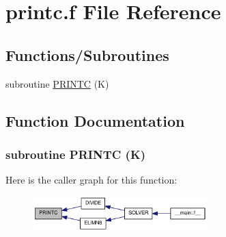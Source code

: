 \hypertarget{printc_8f}{
\section{printc.f File Reference}
\label{printc_8f}
}
\subsection*{Functions/Subroutines}
\begin{DoxyCompactItemize}
\item 
subroutine \hyperlink{printc_8f_a9cd500386a189740cbb92d34ebd2624d}{PRINTC} (K)
\end{DoxyCompactItemize}


\subsection{Function Documentation}
\hypertarget{printc_8f_a9cd500386a189740cbb92d34ebd2624d}{
\subsubsection[{PRINTC}]{\setlength{\rightskip}{0pt plus 5cm}subroutine PRINTC (K)}}
\label{printc_8f_a9cd500386a189740cbb92d34ebd2624d}


Here is the caller graph for this function:\nopagebreak
\begin{figure}[H]
\begin{center}
\leavevmode
\includegraphics[width=191pt]{printc_8f_a9cd500386a189740cbb92d34ebd2624d_icgraph}
\end{center}
\end{figure}
